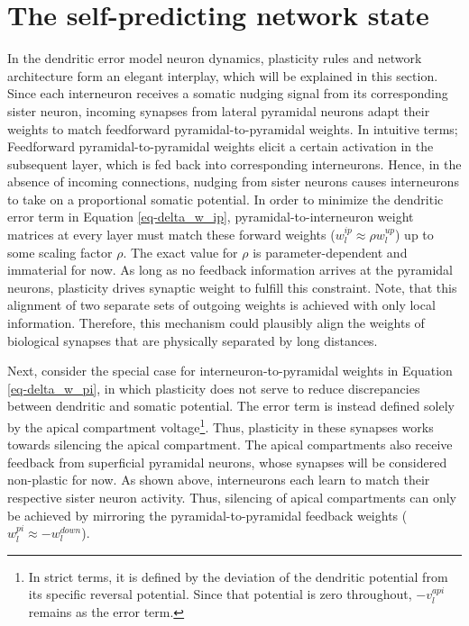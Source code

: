 \section{The self-predicting network state}\label{sec-selfpred}

In the dendritic error model neuron dynamics, plasticity rules and network architecture form an elegant interplay, which
will be explained in this section. Since each interneuron receives a somatic nudging signal from its corresponding
sister neuron, incoming synapses from lateral pyramidal neurons adapt their weights to match feedforward
pyramidal-to-pyramidal weights. In intuitive terms; Feedforward pyramidal-to-pyramidal weights elicit a certain
activation in the subsequent layer, which is fed back into corresponding interneurons. Hence, in the absence of incoming
connections, nudging from sister neurons causes interneurons to take on a proportional somatic potential. In order to
minimize the dendritic error term in Equation \ref{eq-delta_w_ip}, pyramidal-to-interneuron weight matrices at every
layer must match these forward weights ($w_l^{ip} \approx \rho w_l^{up}$) up to some scaling factor $\rho$. The exact
value for $\rho$ is parameter-dependent and immaterial for now. As long as no feedback information arrives at the
pyramidal neurons, plasticity drives synaptic weight to fulfill this constraint. Note, that this alignment of two
separate sets of outgoing weights is achieved with only local information. Therefore, this mechanism could plausibly
align the weights of biological synapses that are physically separated by long distances. \newline

Next, consider the special case for interneuron-to-pyramidal weights in Equation \ref{eq-delta_w_pi}, in which
plasticity does not serve to reduce discrepancies between dendritic and somatic potential. The error term is instead
defined solely by the apical compartment voltage\footnote{In strict terms, it is defined by the deviation of the
dendritic potential from its specific reversal potential. Since that potential is zero throughout, $- v_l^{api}$ remains
as the error term.}. Thus, plasticity in these synapses works towards silencing the apical compartment. The apical
compartments also receive feedback from superficial pyramidal neurons, whose synapses will be considered non-plastic for
now. As shown above, interneurons each learn to match their respective sister neuron activity. Thus, silencing of apical
compartments can only be achieved by mirroring the pyramidal-to-pyramidal feedback weights ($w_l^{pi} \approx
-w_l^{down}$).\newline

